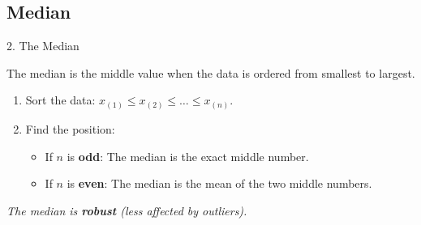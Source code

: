 \subsection{Median}
\begin{frame}{2. The Median}
    \begin{definition}[Median]
        The \alert{median} is the middle value when the data is ordered from smallest to largest.
    \end{definition}
    
    \pause
    
    \begin{recipe}
        \begin{enumerate}
            \item Sort the data: $x_{(1)} \le x_{(2)} \le \dots \le x_{(n)}$.
            \item Find the position:
            \begin{itemize}
                \item If $n$ is \textbf{odd}: The median is the exact middle number.
                \item If $n$ is \textbf{even}: The median is the mean of the two middle numbers.
            \end{itemize}
        \end{enumerate}
    \end{recipe}
    
    \textit{The median is \textbf{robust} (less affected by outliers).}
\end{frame}

